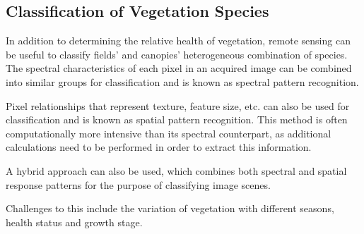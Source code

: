 \subsection{Classification of Vegetation Species}
In addition to determining the relative health of vegetation, remote sensing can be useful to classify fields' and canopies' heterogeneous combination of species.  The spectral characteristics of each pixel in an acquired image can be combined into similar groups for classification and is known as spectral pattern recognition.

Pixel relationships that represent texture, feature size, etc. can also be used for classification and is known as spatial pattern recognition. This method is often computationally more intensive than its spectral counterpart, as additional calculations need to be performed in order to extract this information.

A hybrid approach can also be used, which combines both spectral and spatial response patterns for the purpose of classifying image scenes.

Challenges to this include the variation of vegetation with different seasons, health status and growth stage.
